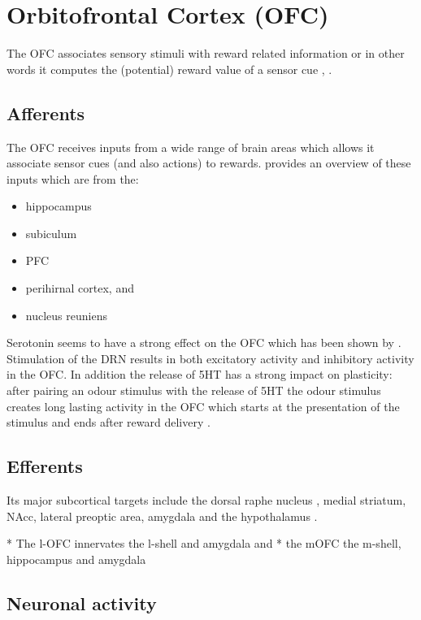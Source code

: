 \documentclass[12pt,a4paper]{article}
\let\oldsection\section
\renewcommand\section{\clearpage\oldsection}
\begin{document}
\section{Orbitofrontal Cortex (OFC)}

The OFC associates sensory stimuli with reward related information \citep{Schoenbaum.2009} or in other words it computes the (potential) reward value of a sensor cue \citep{Wikenheiser2016}, \citep{Bari2013}.

\subsection{Afferents}

The OFC receives inputs from a wide range of brain areas which allows it associate sensor cues (and also actions) to rewards. \citep{Wikenheiser2016} provides an overview of these inputs which are from the:

\begin{itemize}
\item hippocampus
\item subiculum
\item PFC
\item perihirnal cortex, and
\item nucleus reuniens
\end{itemize}

Serotonin seems to have a strong effect on the OFC which has been shown by \citep{Zhou2015}. Stimulation of the DRN results in both excitatory activity and inhibitory activity in the OFC. In addition the release of 5HT has a strong impact on plasticity: after pairing an odour stimulus with the release of 5HT the odour stimulus creates long lasting activity in the OFC which starts at the presentation of the stimulus and ends after reward delivery  \citep{Zhou2015}.

\subsection{Efferents}

Its major subcortical targets include the dorsal raphe nucleus \citep{Luo2015}, medial striatum, NAcc, lateral preoptic area, amygdala and the hypothalamus \citep{Vertes2012}.

  * The l-OFC innervates the l-shell and amygdala and 
  * the mOFC the m-shell, hippocampus and amygdala \citep{Brog1993} \citep{Noonan2012}

\subsection{Neuronal activity}
\end{document}

